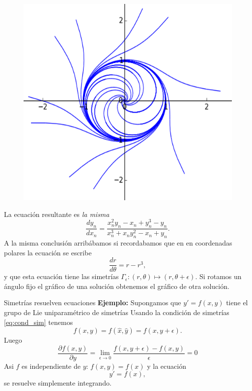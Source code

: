 \begin{figure}
 \includegraphics[scale=.4]{imagenes/sol_rotadas.png}
\end{figure}
La ecuación resultante es \emph{la misma}
\[\frac{dy_n}{dx_n}=\frac{x_{n}^{2} y_{n} - x_{n} + y_{n}^{3} - y_{n}}{x_{n}^{3} + x_{n} y_{n}^{2}
    - x_{n} + y_{n}}.\]
A la misma conclusión arribábamos si recordabamos que en en coordenadas polares la ecuación se escribe
\[\frac{dr}{d\theta}=r-r^3,\]
y que esta ecuación tiene las simetrías $\Gamma_{\epsilon}:(r,\theta)\mapsto (r,\theta+\epsilon)$. Si rotamos un ángulo fijo el gráfico de una solución obtenemos el gráfico de otra solución.










{Simetrías resuelven ecuaciones}\label{pag:sim_tras}
\textbf{Ejemplo:} Supongamos que $y'=f(x,y)$ tiene  el grupo de Lie uniparamétrico de simetrías
Usando la condición de simetrías \eqref{eq:cond_sim} tenemos
\[f(x,y)=f(\hat{x},\hat{y})=f(x,y+\epsilon).\]
Luego
\[\frac{\partial f(x,y)}{\partial y}=\lim_{\epsilon\to 0}
\frac{f(x,y+\epsilon)-f(x,y)}{\epsilon}=0\]
Asi $f$ es independiente de $y$: $f(x,y)=f(x)$ y la ecuación
\[y'=f(x),\]
se resuelve simplemente integrando.



